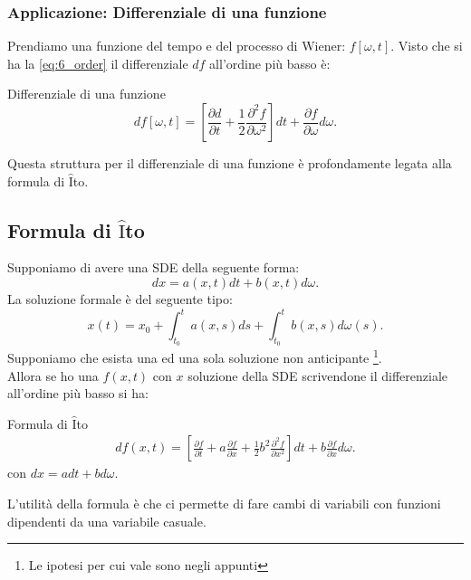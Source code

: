 \subsubsection{Applicazione: Differenziale di una funzione}%
\label{subsub:Applicazione: Differenziale di una funzione}
Prendiamo una funzione del tempo e del processo di Wiener: $f\left[\omega,t\right]$. Visto che si ha la \ref{eq:6_order} il differenziale $df$  all'ordine più basso è:
\begin{bluebox}{Differenziale di una funzione}
    \[
	df\left[\omega,t\right] = \left[\frac{\partial d}{\partial t} + \frac{1}{2}\frac{\partial ^2 f}{\partial \omega^2} \right]dt + \frac{\partial f}{\partial \omega} d\omega
    .\] 
\end{bluebox}
\noindent
Questa struttura per il differenziale di una funzione è profondamente legata alla formula di $\hat{\text{I}}$to.
\subsection{Formula di $\hat{\text{I}}$to}%
\label{sub:Formula di ITO}
Supponiamo di avere una SDE della seguente forma:
\[
    dx = a(x,t) dt + b(x,t) d\omega
.\] 
La soluzione formale è del seguente tipo:
\[
    x(t) = x_0 + \int_{t_0}^{t} a(x,s) ds + \int_{t_0}^{t} b(x,s) d\omega (s)   
.\] 
Supponiamo che esista una ed una sola soluzione non anticipante
\footnote{Le ipotesi per cui vale sono negli appunti}. \\
Allora se ho una $f(x,t)$ con $x$ soluzione della SDE scrivendone il differenziale all'ordine più basso si ha:
\begin{redbox}{Formula di $\hat{\text{I}}$to}
    \[\begin{aligned}
	df(x,t) = 
	\left[\frac{\partial f}{\partial t} + 
	a \frac{\partial f}{\partial x} +
        \frac{1}{2}b^2 \frac{\partial ^2 f}{\partial x^2} \right] dt +
	b\frac{\partial f}{\partial x} d\omega 
    .\end{aligned}\]
    con $dx = adt + bd\omega$.
\end{redbox}
\noindent
L'utilità della formula è che ci permette di fare cambi di variabili con funzioni dipendenti da una variabile casuale.

